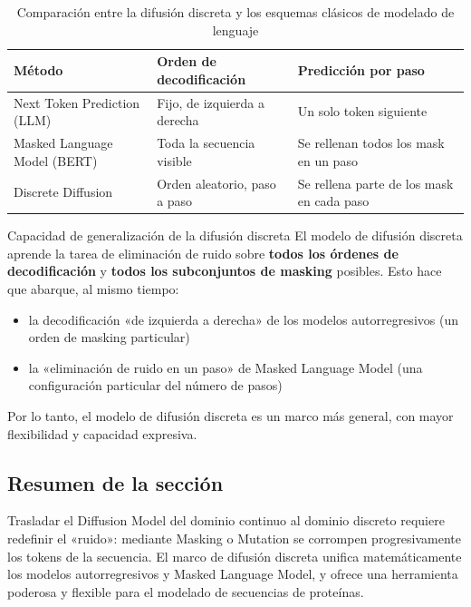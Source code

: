 \begin{table}[H]
\centering
\caption{Comparación entre la difusión discreta y los esquemas clásicos de modelado de lenguaje}
\begin{tabular}{@{}lll@{}}
\toprule
\textbf{Método} & \textbf{Orden de decodificación} & \textbf{Predicción por paso} \\
\midrule
Next Token Prediction (LLM) & Fijo, de izquierda a derecha & Un solo token siguiente \\
Masked Language Model (BERT) & Toda la secuencia visible & Se rellenan todos los mask en un paso \\
Discrete Diffusion & Orden aleatorio, paso a paso & Se rellena parte de los mask en cada paso \\
\bottomrule
\end{tabular}
\end{table}

\begin{importantbox}{Capacidad de generalización de la difusión discreta}
El modelo de difusión discreta aprende la tarea de eliminación de ruido sobre \textbf{todos los órdenes de decodificación} y \textbf{todos los subconjuntos de masking} posibles. Esto hace que abarque, al mismo tiempo:
\begin{itemize}
    \item la decodificación «de izquierda a derecha» de los modelos autorregresivos (un orden de masking particular)
    \item la «eliminación de ruido en un paso» de Masked Language Model (una configuración particular del número de pasos)
\end{itemize}
Por lo tanto, el modelo de difusión discreta es un marco más general, con mayor flexibilidad y capacidad expresiva.
\end{importantbox}

\subsection{Resumen de la sección}

Trasladar el Diffusion Model del dominio continuo al dominio discreto requiere redefinir el «ruido»: mediante Masking o Mutation se corrompen progresivamente los tokens de la secuencia. El marco de difusión discreta unifica matemáticamente los modelos autorregresivos y Masked Language Model, y ofrece una herramienta poderosa y flexible para el modelado de secuencias de proteínas.


